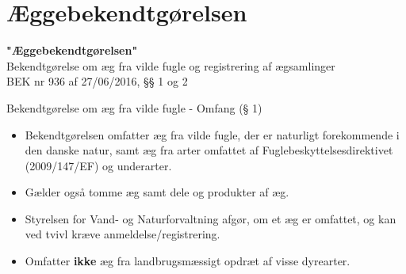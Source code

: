 \section{Æggebekendtgørelsen}

\begin{frame}
  \vspace{3em}
  \begin{center}
    {\LARGE \textbf{"Æggebekendtgørelsen"}
    }
    \\
    \vspace{1em}
    Bekendtgørelse om æg fra vilde fugle og registrering af ægsamlinger
    \\
    \vspace{1em}
    BEK nr 936 af 27/06/2016, §§ 1 og 2
  \end{center}
\end{frame}


\begin{frame}{Bekendtgørelse om æg fra vilde fugle - Omfang (§ 1)}
\vspace{1em}

\small

\raggedright

\begin{itemize}

\itemsep0.6em %

\item Bekendtgørelsen omfatter æg fra vilde fugle, der er naturligt forekommende i den danske natur, samt æg fra arter omfattet af Fuglebeskyttelsesdirektivet (2009/147/EF) og underarter.

\item Gælder også tomme æg samt dele og produkter af æg.

\item Styrelsen for Vand- og Naturforvaltning afgør, om et æg er omfattet, og kan ved tvivl kræve anmeldelse/registrering.

\item Omfatter \textbf{ikke} æg fra landbrugsmæssigt opdræt af visse dyrearter.

\end{itemize}

\end{frame}



